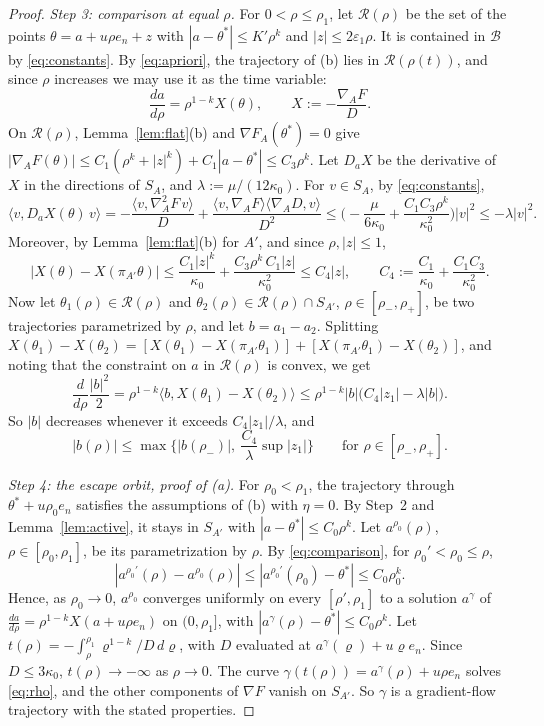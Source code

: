 \documentclass[11pt]{article}
\theoremstyle{definition}
\theoremstyle{remark}
\newcommand{\cB}{\mathcal{B}}
\newcommand{\cR}{\mathcal{R}}
\newcommand{\eps}{\varepsilon}
\newcommand{\ip}[2]{\langle #1,#2\rangle}
\begin{document}
\begin{proof}
\emph{Step 3: comparison at equal $\rho$.} For $0<\rho\le\rho_1$, let $\cR(\rho)$ be the set of the points $\theta=a+u\rho e_n+z$ with $|a-\theta^*|\le K'\rho^k$ and $|z|\le2\eps_1\rho$. It is contained in $\cB$ by \eqref{eq:constants}. By \eqref{eq:apriori}, the trajectory of (b) lies in $\cR(\rho(t))$, and since $\rho$ increases we may use it as the time variable:
\[
\frac{da}{d\rho}=\rho^{1-k}X(\theta),\qquad X:=-\frac{\nabla_AF}{D}.
\]
On $\cR(\rho)$, Lemma~\ref{lem:flat}(b) and $\nabla F_A(\theta^*)=0$ give $|\nabla_AF(\theta)|\le C_1(\rho^k+|z|^k)+C_1|a-\theta^*|\le C_3\rho^k$. Let $D_aX$ be the derivative of $X$ in the directions of $S_A$, and $\lambda:=\mu/(12\kappa_0)$. For $v\in S_A$, by \eqref{eq:constants},
\[
\ip{v}{D_aX(\theta)\,v}=-\frac{\ip{v}{\nabla_A^2F\,v}}{D}+\frac{\ip{v}{\nabla_AF}\ip{\nabla_AD}{v}}{D^2}\le\Big(-\frac{\mu}{6\kappa_0}+\frac{C_1C_3\rho^k}{\kappa_0^2}\Big)|v|^2\le-\lambda|v|^2 .
\]
Moreover, by Lemma~\ref{lem:flat}(b) for $A'$, and since $\rho,|z|\le1$,
\[
|X(\theta)-X(\pi_{A'}\theta)|\le\frac{C_1|z|^k}{\kappa_0}+\frac{C_3\rho^k\,C_1|z|}{\kappa_0^2}\le C_4|z|,\qquad C_4:=\frac{C_1}{\kappa_0}+\frac{C_1C_3}{\kappa_0^2}.
\]
Now let $\theta_1(\rho)\in\cR(\rho)$ and $\theta_2(\rho)\in\cR(\rho)\cap S_{A'}$, $\rho\in[\rho_-,\rho_+]$, be two trajectories parametrized by $\rho$, and let $b=a_1-a_2$. Splitting $X(\theta_1)-X(\theta_2)=[X(\theta_1)-X(\pi_{A'}\theta_1)]+[X(\pi_{A'}\theta_1)-X(\theta_2)]$, and noting that the constraint on $a$ in $\cR(\rho)$ is convex, we get
\[
\frac{d}{d\rho}\frac{|b|^2}2=\rho^{1-k}\ip{b}{X(\theta_1)-X(\theta_2)}\le\rho^{1-k}|b|\big(C_4|z_1|-\lambda|b|\big).
\]
So $|b|$ decreases whenever it exceeds $C_4|z_1|/\lambda$, and
\begin{equation}\label{eq:comparison}
|b(\rho)|\le\max\Big\{|b(\rho_-)|,\ \frac{C_4}{\lambda}\sup|z_1|\Big\}\qquad\text{for }\rho\in[\rho_-,\rho_+].
\end{equation}

\emph{Step 4: the escape orbit, proof of (a).} For $\rho_0<\rho_1$, the trajectory through $\theta^*+u\rho_0e_n$ satisfies the assumptions of (b) with $\eta=0$. By Step~2 and Lemma~\ref{lem:active}, it stays in $S_{A'}$ with $|a-\theta^*|\le C_0\rho^k$. Let $a^{\rho_0}(\rho)$, $\rho\in[\rho_0,\rho_1]$, be its parametrization by $\rho$. By \eqref{eq:comparison}, for $\rho_0'<\rho_0\le\rho$,
\[
|a^{\rho_0'}(\rho)-a^{\rho_0}(\rho)|\le|a^{\rho_0'}(\rho_0)-\theta^*|\le C_0\rho_0^k .
\]
Hence, as $\rho_0\to0$, $a^{\rho_0}$ converges uniformly on every $[\rho',\rho_1]$ to a solution $a^\gamma$ of $\frac{da}{d\rho}=\rho^{1-k}X(a+u\rho e_n)$ on $(0,\rho_1]$, with $|a^\gamma(\rho)-\theta^*|\le C_0\rho^k$. Let $t(\rho)=-\int_\rho^{\rho_1}\varrho^{1-k}/D\,d\varrho$, with $D$ evaluated at $a^\gamma(\varrho)+u\varrho e_n$. Since $D\le3\kappa_0$, $t(\rho)\to-\infty$ as $\rho\to0$. The curve $\gamma(t(\rho))=a^\gamma(\rho)+u\rho e_n$ solves \eqref{eq:rho}, and the other components of $\nabla F$ vanish on $S_{A'}$. So $\gamma$ is a gradient-flow trajectory with the stated properties.


\end{proof}
\end{document}
